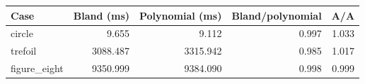 \begin{tabular}{lrrrr}
\toprule
Case & Bland (ms) & Polynomial (ms) & Bland/polynomial & A/A \\
\midrule
circle & 9.655 & 9.112 & 0.997 & 1.033 \\
trefoil & 3088.487 & 3315.942 & 0.985 & 1.017 \\
figure\_eight & 9350.999 & 9384.090 & 0.998 & 0.999 \\
\bottomrule
\end{tabular}
